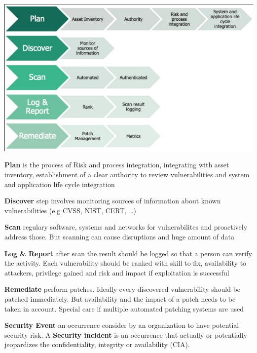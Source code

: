 \documentclass[11pt,twoside,landscape]{article}
\begin{document}
\begin{multicols}{4}
\begin{center}
\includegraphics[width=.9\linewidth]{img/vulnerability_management_steps.png}
\end{center}

\textbf{Plan} is the process of Risk and process integration, integrating with asset inventory, establishment of a clear authority to review vulnerabilities and system and application life cycle integration

\textbf{Discover} step involves monitoring sources of information about known vulnerabilities (e.g CVSS, NIST, CERT, \ldots{})

\textbf{Scan} regulary software, systems and networks for vulnerabilites and proactively address those. But scanning can cause disruptions and huge amount of data

\textbf{Log \& Report} after scan the result should be logged so that a person can verify the activity. Each vulnerability should be ranked with skill to fix, availability to attackers, privilege gained and risk and impact if exploitation is successful

\textbf{Remediate} perform patches. Ideally every discovered vulnerability should be patched immediately. But availability and the impact of a patch needs to be taken in account. Special care if multiple automated patching systems are used


\textbf{Security Event} an occurrence consider by an organization to have potential security risk. A \textbf{Security incident} is an occurrence that actually or potentially jeopardizes the confidentiality, integrity or availability (CIA).


\end{multicols}
\end{document}
